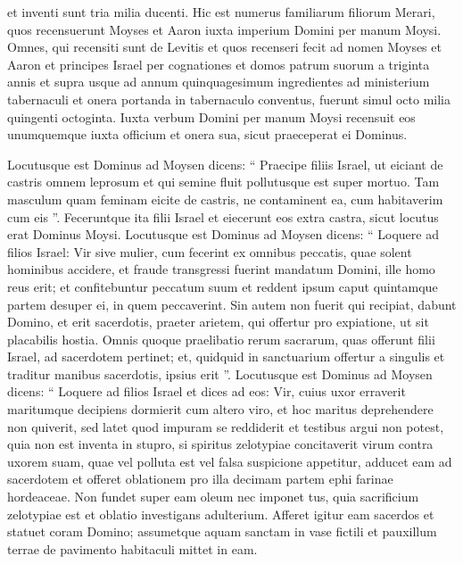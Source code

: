 \begin{biblechapter}
\begin{biblechapter}
\begin{biblechapter}
\begin{biblechapter}
\verse et inventi sunt tria milia ducenti. 
\verse Hic est numerus familiarum filiorum Merari, quos recensuerunt Moyses et Aaron iuxta imperium Domini per manum Moysi.
 \verse Omnes, qui recensiti sunt de Levitis et quos recenseri fecit ad nomen Moyses et Aaron et principes Israel per cognationes et domos patrum suorum 
\verse a triginta annis et supra usque ad annum quinquagesimum ingredientes ad ministerium tabernaculi et onera portanda in tabernaculo conventus, 
\verse fuerunt simul octo milia quingenti octoginta. \verse Iuxta verbum Domini per manum Moysi recensuit eos unumquemque iuxta officium et onera sua, sicut praeceperat ei Dominus.
 
\begin{biblechapter}
\verse Locutusque est Dominus ad Moysen dicens: 
\verse “ Praecipe filiis Israel, ut eiciant de castris omnem leprosum et qui semine fluit pollutusque est super mortuo. 
\verse Tam masculum quam feminam eicite de castris, ne contaminent ea, cum habitaverim cum eis ”. 
\verse Feceruntque ita filii Israel et eiecerunt eos extra castra, sicut locutus erat Dominus Moysi. 
\verse Locutusque est Dominus ad Moysen dicens: 
\verse “ Loquere ad filios Israel: Vir sive mulier, cum fecerint ex omnibus peccatis, quae solent hominibus accidere, et fraude transgressi fuerint mandatum Domini, ille homo reus erit; 
\verse et confitebuntur peccatum suum et reddent ipsum caput quintamque partem desuper ei, in quem peccaverint. 
 \verse Sin autem non fuerit qui recipiat, dabunt Domino, et erit sacerdotis, praeter arietem, qui offertur pro expiatione, ut sit placabilis hostia.
 \verse Omnis quoque praelibatio rerum sacrarum, quas offerunt filii Israel, ad sacerdotem pertinet; 
\verse et, quidquid in sanctuarium offertur a singulis et traditur manibus sacerdotis, ipsius erit ”.
 \verse Locutusque est Dominus ad Moysen dicens: 
\verse “ Loquere ad filios Israel et dices ad eos: Vir, cuius uxor erraverit maritumque decipiens 
\verse dormierit cum altero viro, et hoc maritus deprehendere non quiverit, sed latet quod impuram se reddiderit et testibus argui non potest, quia non est inventa in stupro, 
\verse si spiritus zelotypiae concitaverit virum contra uxorem suam, quae vel polluta est vel falsa suspicione appetitur, 
\verse adducet eam ad sacerdotem et offeret oblationem pro illa decimam partem ephi farinae hordeaceae. Non fundet super eam oleum nec imponet tus, quia sacrificium zelotypiae est et oblatio investigans adulterium.
 \verse Afferet igitur eam sacerdos et statuet coram Domino; 
\verse assumetque aquam sanctam in vase fictili et pauxillum terrae de pavimento habitaculi mittet in eam. 

\end{biblechapter}
\end{biblechapter}
\end{biblechapter}
\end{biblechapter}
\end{biblechapter}

